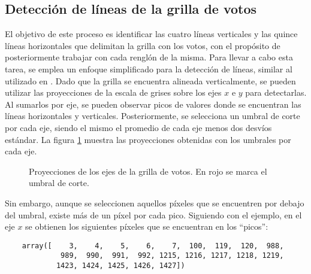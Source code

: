\subsection{Detección de líneas de la grilla de votos}

El objetivo de este proceso es identificar las cuatro líneas verticales y las quince líneas horizontales que delimitan
la grilla con los votos, con el propósito de posteriormente trabajar con cada renglón de la misma. Para llevar a cabo
esta tarea, se emplea un enfoque simplificado para la detección de líneas, similar al utilizado en
\citet{lamagna2016lectura}. Dado que la grilla se encuentra alineada verticalmente, se pueden utilizar las proyecciones
de la escala de grises sobre los ejes $x$ e $y$ para detectarlas. Al sumarlos por eje, se pueden observar picos de
valores donde se encuentran las líneas horizontales y verticales. Posteriormente, se selecciona un umbral de corte por
cada eje, siendo el mismo el promedio de cada eje menos dos desvíos estándar. La figura \ref{fig:etl-3-proyecciones}
muestra las proyecciones obtenidas con los umbrales por cada eje.

\begin{figure}[H]
    \centering



    \caption[Proyecciones de los ejes de la grilla de votos]{Proyecciones de los ejes de la grilla de votos. En rojo se marca el umbral de corte.}
    \label{fig:etl-3-proyecciones}
\end{figure}

Sin embargo, aunque se seleccionen aquellos píxeles que se encuentren por debajo del umbral, existe más de un píxel por
cada pico. Siguiendo con el ejemplo, en el eje $x$ se obtienen los siguientes píxeles que se encuentran en los
``picos'':

\begin{verbatim}
    array([    3,    4,    5,    6,    7,  100,  119,  120,  988, 
             989,  990,  991,  992, 1215, 1216, 1217, 1218, 1219, 
            1423, 1424, 1425, 1426, 1427])
\end{verbatim}

